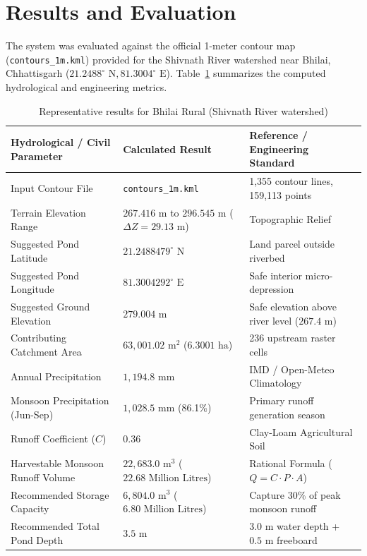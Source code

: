 \documentclass[manuscript,screen,nonacm]{acmart}
\begin{document}
\section{Results and Evaluation}
\label{sec:results}
The system was evaluated against the official 1-meter contour map (\texttt{contours\_1m.kml}) provided for the Shivnath River watershed near Bhilai, Chhattisgarh ($21.2488^\circ\text{ N}, 81.3004^\circ\text{ E}$). Table~\ref{tab:results} summarizes the computed hydrological and engineering metrics.

\begin{table}[h]
  \caption{Representative results for Bhilai Rural (Shivnath River watershed)}
  \label{tab:results}
  \begin{tabular}{lll}
    \toprule
    Hydrological / Civil Parameter & Calculated Result & Reference / Engineering Standard \\
    \midrule
    Input Contour File & \texttt{contours\_1m.kml} & 1,355 contour lines, 159,113 points \\
    Terrain Elevation Range & $267.416\text{ m}$ to $296.545\text{ m}$ ($\Delta Z = 29.13\text{ m}$) & Topographic Relief \\
    Suggested Pond Latitude & $21.2488479^\circ\text{ N}$ & Land parcel outside riverbed \\
    Suggested Pond Longitude & $81.3004292^\circ\text{ E}$ & Safe interior micro-depression \\
    Suggested Ground Elevation & $279.004\text{ m}$ & Safe elevation above river level ($267.4\text{ m}$) \\
    Contributing Catchment Area & $63,001.02\text{ m}^2$ ($6.3001\text{ ha}$) & 236 upstream raster cells \\
    Annual Precipitation & $1,194.8\text{ mm}$ & IMD / Open-Meteo Climatology \\
    Monsoon Precipitation (Jun-Sep) & $1,028.5\text{ mm}$ (86.1\%) & Primary runoff generation season \\
    Runoff Coefficient ($C$) & $0.36$ & Clay-Loam Agricultural Soil \\
    Harvestable Monsoon Runoff Volume & $22,683.0\text{ m}^3$ ($22.68\text{ Million Litres}$) & Rational Formula ($Q = C \cdot P \cdot A$) \\
    Recommended Storage Capacity & $6,804.0\text{ m}^3$ ($6.80\text{ Million Litres}$) & Capture 30\% of peak monsoon runoff \\
    Recommended Total Pond Depth & $3.5\text{ m}$ & $3.0\text{ m}$ water depth + $0.5\text{ m}$ freeboard \\

\end{tabular}
\end{table}
\end{document}
